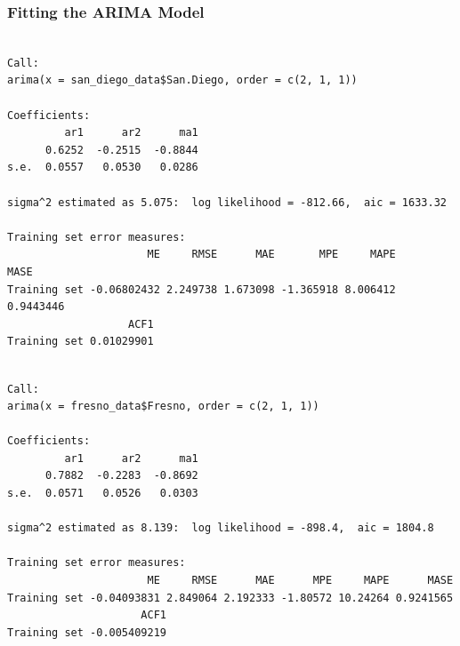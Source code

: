 \documentclass[
  11pt,
]{article}
\newenvironment{Shaded}{\begin{snugshade}}{\end{snugshade}}
\newcommand{\AttributeTok}[1]{\textcolor[rgb]{0.40,0.45,0.13}{#1}}
\newcommand{\CommentTok}[1]{\textcolor[rgb]{0.37,0.37,0.37}{#1}}
\newcommand{\DecValTok}[1]{\textcolor[rgb]{0.68,0.00,0.00}{#1}}
\newcommand{\FunctionTok}[1]{\textcolor[rgb]{0.28,0.35,0.67}{#1}}
\newcommand{\NormalTok}[1]{\textcolor[rgb]{0.00,0.23,0.31}{#1}}
\newcommand{\OtherTok}[1]{\textcolor[rgb]{0.00,0.23,0.31}{#1}}
\newcommand{\SpecialCharTok}[1]{\textcolor[rgb]{0.37,0.37,0.37}{#1}}
\begin{document}
\subsubsection{Fitting the ARIMA Model}\label{fitting-the-arima-model}

\begin{Shaded}
\end{Shaded}

\begin{verbatim}

Call:
arima(x = san_diego_data$San.Diego, order = c(2, 1, 1))

Coefficients:
         ar1      ar2      ma1
      0.6252  -0.2515  -0.8844
s.e.  0.0557   0.0530   0.0286

sigma^2 estimated as 5.075:  log likelihood = -812.66,  aic = 1633.32

Training set error measures:
                      ME     RMSE      MAE       MPE     MAPE      MASE
Training set -0.06802432 2.249738 1.673098 -1.365918 8.006412 0.9443446
                   ACF1
Training set 0.01029901
\end{verbatim}

\begin{Shaded}
\end{Shaded}

\begin{verbatim}

Call:
arima(x = fresno_data$Fresno, order = c(2, 1, 1))

Coefficients:
         ar1      ar2      ma1
      0.7882  -0.2283  -0.8692
s.e.  0.0571   0.0526   0.0303

sigma^2 estimated as 8.139:  log likelihood = -898.4,  aic = 1804.8

Training set error measures:
                      ME     RMSE      MAE      MPE     MAPE      MASE
Training set -0.04093831 2.849064 2.192333 -1.80572 10.24264 0.9241565
                     ACF1
Training set -0.005409219
\end{verbatim}
\end{document}
